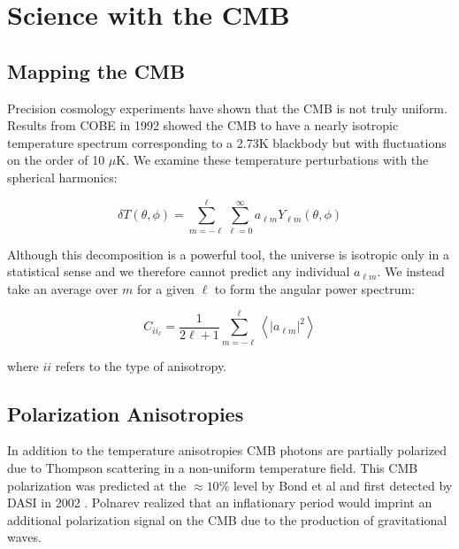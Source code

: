\documentclass[12pt]{article}
\begin{document}
\section{Science with the CMB}

\subsection{Mapping the CMB}
Precision cosmology experiments have shown that the CMB is not truly uniform.
Results from COBE in 1992\cite{cite:COBE} showed the CMB to have a nearly
isotropic temperature spectrum corresponding to a 2.73K blackbody but with
fluctuations on the order of 10 $\mu$K. We examine these temperature
perturbations with the spherical harmonics:


\begin{equation}
	\delta T(\theta,\phi) = \sum _{m=-\ell} ^\ell \sum _{\ell=0} ^\infty
	a_{\ell m}Y_{\ell m}(\theta,\phi)
\end{equation}


Although this decomposition is a powerful tool, the universe is isotropic only
in a statistical sense and we therefore cannot predict any individual $a_{\ell
m}$. We instead take an average over $m$ for a given $\ell$ to form the
angular power spectrum:

\begin{equation}
	C_{ii_\ell} = \frac{1}{2\ell +1}\sum _{m=-\ell} ^\ell \left< |a_{\ell m}|^2
	\right>
\end{equation}

where $ii$ refers to the type of anisotropy.

\subsection{Polarization Anisotropies}
In addition to the temperature anisotropies CMB photons are partially
polarized due to Thompson scattering in a non-uniform temperature field. This
CMB polarization was predicted at the $\approx 10\%$ level by Bond et al
\cite{cite:Bond} and first detected by DASI in 2002 \cite{cite:DASI}. Polnarev
\cite{cite:Polnarev} realized that an inflationary period would imprint an
additional polarization signal on the CMB due to the production of
gravitational waves. 
\end{document}
